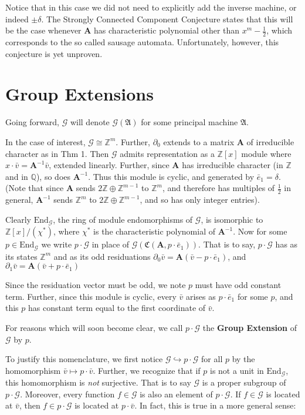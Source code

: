 \documentclass[12pt]{article}
\newcommand{\G}{\mathcal{G}}
\renewcommand{\P}{\mathfrak{A}}
\newcommand{\Z}{\mathbb{Z}}
\newcommand{\Q}{\mathbb{Q}}
\newcommand{\2}{\textbf{2}}
\newcommand{\Am}{\textbf{A}}
\newcommand{\del}{\partial}
\renewcommand{\v}{\bar{v}}
\newcommand{\e}{\bar{e}}
\begin{document}
Notice that in this case we did not need to explicitly add the 
inverse machine, or indeed $\pm \delta$. The Strongly Connected Component
Conjecture states that this will be the case whenever $\Am$ has 
characteristic polynomial other than $x^m - \frac{1}{2}$, which corresponds
to the so called sausage automata. Unfortunately, however, 
this conjecture is yet unproven.

\section{Group Extensions}
Going forward, $\G$ will denote $\G(\P)$ for some principal machine $\P$.

In the case of interest, $\G \cong \Z^m$. Further, $\del_0$ extends to 
a matrix $\Am$ of irreducible character as in Thm 1. Then
$\G$ admits representation as a $\Z[x]$ module where 
$x \cdot \v = \Am^{-1}\v$, extended linearly.
Further, since $\Am$ has irreducible character (in $\Z$ and in $\Q$), 
so does $\Am^{-1}$. Thus this module is cyclic, 
and generated by $\e_1 = \delta$. 
(Note that since $\Am$ sends $2\Z \oplus \Z^{m-1}$ to $\Z^m$, and therefore
has multiples of $\frac{1}{2}$ in general, $\Am^{-1}$ sends $\Z^m$ to 
$2\Z \oplus \Z^{m-1}$, and so has only integer entries).

Clearly $\text{End}_{\G}$, the ring of module endomorphisms of $\G$, 
is isomorphic to $\Z[x]/(\chi^*)$, 
where $\chi^*$ is the characteristic polynomial of $\Am^{-1}$.
Now for some $p \in \text{End}_{\G}$ we write
$p \cdot \G$ in place of $\G(\mathfrak{C}(\Am,p \cdot \e_1))$.
That is to say, $p \cdot \G$ has as its states $\Z^m$ and as its 
odd residuations
$\del_0 \v = \Am (\v - p \cdot \e_1)$, and 
$\del_1 \v = \Am (\v + p \cdot \e_1)$

Since the residuation vector must be odd, we note $p$ must have odd
constant term. Further, since this module is cyclic, every $\v$ arises
as $p \cdot \e_1$ for some $p$, and this $p$ has constant term equal to
the first coordinate of $\v$.

For reasons which will soon become clear, we call $p \cdot \G$ the
\textbf{Group Extension} of $\G$ by $p$.

To justify this nomenclature, we first notice 
$\G \hookrightarrow p \cdot \G$ for all $p$ by the
homomorphism $\v \mapsto p \cdot \v$. 
Further, we recognize that if $p$ is not a unit in $\text{End}_{\G}$, 
this homomorphism is \emph{not} surjective. 
That is to say $\G$ is a proper subgroup of $p \cdot \G$.
Moreover, every function $f \in \G$ is also an element of $p \cdot \G$. 
If $f \in \G$ is located at $\v$, then $f \in p \cdot \G$ is located
at $p \cdot \v$. In fact, this is true in a more general sense:
\end{document}
